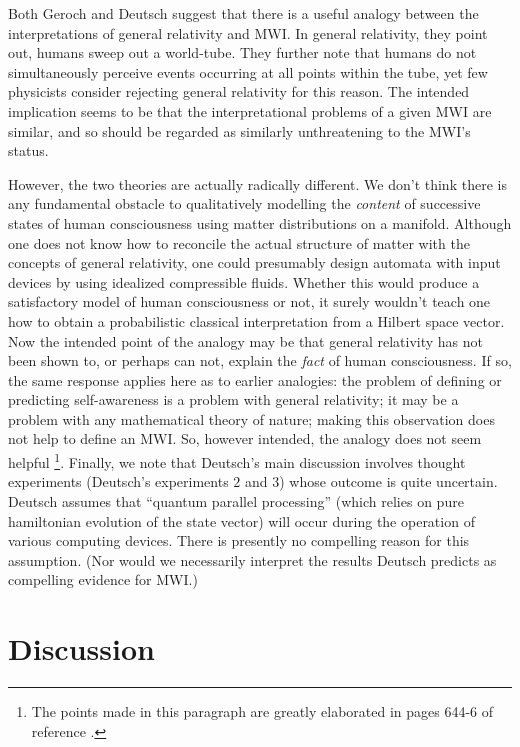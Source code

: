 \documentclass[aps,pra,12pt]{revtex4}
\begin{document}
Both Geroch and Deutsch suggest that there is a useful analogy
between the interpretations of general relativity and MWI.
In general relativity, they point out, humans sweep out a world-tube.
They further note that 
humans do not simultaneously perceive events occurring at all points within
the tube, yet few physicists consider rejecting general relativity for
this reason. 
The intended implication seems to be 
that the interpretational problems of a given MWI are 
similar, and so should be regarded as similarly unthreatening to the MWI's 
status. 

However, the two theories are actually radically different.
We don't think there is any fundamental obstacle to qualitatively
modelling the {\em content} of successive states of 
human consciousness using matter 
distributions on a manifold. 
Although one does not know how to reconcile the actual structure of matter
with the concepts of general relativity, one could presumably
design automata with input devices by
using idealized compressible fluids. 
Whether this would produce a satisfactory model of human
consciousness or not, it surely wouldn't teach one 
how to obtain a probabilistic classical interpretation from 
a Hilbert space vector. 
Now the intended point of the analogy may be that general relativity has not
been shown to,
or perhaps can not, explain the {\em fact} of human consciousness.  
If so, the same response applies here as to earlier analogies: the problem
of defining or predicting self-awareness is a problem with general relativity;
it may be a problem with any mathematical theory of nature; making this
observation does not help to define an MWI. 
So, however intended, the analogy does not seem helpful \footnote{The points 
made in this paragraph are greatly elaborated in 
pages 644-6 of reference \cite{stein}.}.
Finally, we note that Deutsch's main discussion involves thought
experiments (Deutsch's experiments $2$ and $3$) whose outcome is quite
uncertain. Deutsch assumes that ``quantum parallel processing''
(which relies on pure hamiltonian evolution of the state vector) will occur
during the operation of various computing devices.  There is presently
no compelling reason for this assumption. 
(Nor would we necessarily interpret the results Deutsch predicts as compelling
evidence for MWI.)

\section{Discussion} 
\end{document}
